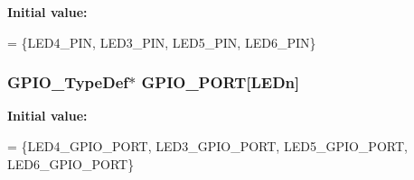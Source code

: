 {\bfseries Initial value\-:}
\begin{DoxyCode}
= \{LED4\_PIN, LED3\_PIN, LED5\_PIN,
                                 LED6\_PIN\}
\end{DoxyCode}
\hypertarget{group___s_t_m32_f4___d_i_s_c_o_v_e_r_y___l_o_w___l_e_v_e_l___private___variables_gadfddcc182c40163aaa7b3c7f36e42ed9}{
\subsubsection[{G\-P\-I\-O\-\_\-\-P\-O\-R\-T}]{\setlength{\rightskip}{0pt plus 5cm}G\-P\-I\-O\-\_\-\-Type\-Def$\ast$ G\-P\-I\-O\-\_\-\-P\-O\-R\-T\mbox{[}L\-E\-Dn\mbox{]}}}\label{group___s_t_m32_f4___d_i_s_c_o_v_e_r_y___l_o_w___l_e_v_e_l___private___variables_gadfddcc182c40163aaa7b3c7f36e42ed9}
{\bfseries Initial value\-:}
\begin{DoxyCode}
= \{LED4\_GPIO\_PORT, LED3\_GPIO\_PORT, LED5\_GPIO\_PORT,
                                 LED6\_GPIO\_PORT\}
\end{DoxyCode}
